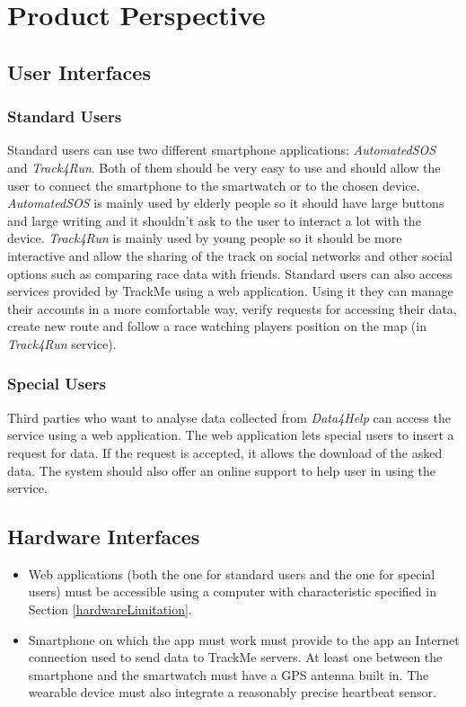 \section{Product Perspective}

\subsection{User Interfaces}\label{userInterfaces}

\subsubsection{Standard Users}
Standard users can use two different smartphone applications: \textit{AutomatedSOS} and \textit{Track4Run}.
Both of them should be very easy to use and should allow the user to connect the smartphone to the smartwatch or to the chosen device.
\textit{AutomatedSOS} is mainly used by elderly people so it should have large buttons and large writing and it shouldn't ask to the user to interact a lot with the device.
\textit{Track4Run} is mainly used by young people so it should be more interactive and allow the sharing of the track on social networks and other social options such as comparing race data with friends.
Standard users can also access services provided by TrackMe using a web application. Using it they can manage their accounts in a more comfortable way, verify requests for accessing their data, create new route and follow a race watching players position on the map (in \textit{Track4Run} service).

\subsubsection{Special Users}
Third parties who want to analyse data collected from \textit{Data4Help} can access the service using a web application.
The web application lets special users to insert a request for data.
If the request is accepted, it allows the download of the asked data.
The system should also offer an online support to help user in using the service.

\subsection{Hardware Interfaces}\label{hardwareInterfaces}
\begin{itemize}
\item Web applications (both the one for standard users and the one for special users) must be accessible using a computer with characteristic specified in Section \ref{hardwareLimitation}.
\item Smartphone on which the app must work must provide to the app an Internet connection used to send data to TrackMe servers.
At least one between the smartphone and the smartwatch must have a GPS antenna built in.
The wearable device must also integrate a reasonably precise heartbeat sensor.
\end{itemize}

